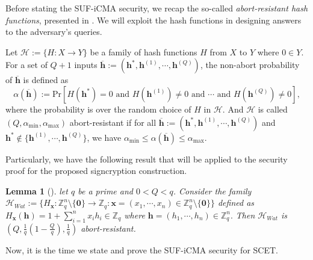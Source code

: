 \documentclass[a4paper,11pt,onecolumn]{elsarticle}
\def\Pr{\mathrm{Pr}}
\newtheorem{lemma}[theorem]{Lemma}
\begin{document}
	
	Before stating the SUF-iCMA security, we recap  the so-called \textit{abort-resistant hash functions}, presented in \cite[Section 7.4.1]{ABB10}. We will exploit the hash functions in designing answers to the adversary's queries.
	
	\begin{definition} \label{def3}
		Let $\mathcal{H}:=\{H:X\rightarrow Y\}$ be a family of hash functions $H$ from $X$ to $Y$ where $0 \in Y$. For a set of $Q+1$ inputs $\overline{\textbf{h}}:=(\textbf{h}^*,\textbf{h}^{(1)}, \cdots, \textbf{h}^{(Q)})$, the non-abort probability of $\overline{\textbf{h}}$ is defined as
		$$\alpha(\overline{\textbf{h}}):=\Pr[H(\textbf{h}^*)=0 \text{ and }H(\textbf{h}^{(1)})\neq 0 \text{ and } \cdots \text{ and } H(\textbf{h}^{(Q)})\neq0],$$
		where the probability is over the random choice of $H$ in $\mathcal{H}$. And $\mathcal{H}$ is called $(Q, \alpha_{\min}, \alpha_{\max})$ abort-resistant if for all $\overline{\textbf{h}}:=(\textbf{h}^*,\textbf{h}^{(1)}, \cdots, \textbf{h}^{(Q)})$ and $\textbf{h}^* \notin \{\textbf{h}^{(1)}, \cdots, \textbf{h}^{(Q)} \}$, we have $ \alpha_{\min}\leq \alpha(\overline{\textbf{h}})\leq  \alpha_{\max}$.
	\end{definition}
	Particularly, we have the following result that will be applied to the security proof for the proposed signcryption construction. 
	
	\begin{lemma}[{\cite[Lemma 27]{ABB10}}] \label{lemma3}
		let $q$ be a prime and $0<Q<q$. Consider the family	$\mathcal{H}_{Wat}:=\{H_{\mathbf{x}}: \mathbb{Z}^{n}_q \setminus \{\mathbf{0}\}\rightarrow \mathbb{Z}_q:  \mathbf{x}=(x_1, \cdots, x_n) \in \mathbb{Z}^{n}_q \setminus \{\mathbf{0}\}\}$  defined  as
		$H_{\mathbf{x}}(\mathbf{h})=1+\sum_{i=1}^{n}x_ih_i \in \mathbb{Z}_q$   where  $ \mathbf{h}=(h_1, \cdots, h_n) \in \mathbb{Z}^{n}_q.$ Then $\mathcal{H}_{Wat}$ is $(Q, \frac{1}{q}(1-\frac{Q}{q}), \frac{1}{q})$ abort-resistant.
	\end{lemma}
	Now, it is the time we  state and prove the SUF-iCMA security for \textsf{SCET}.
	
\end{document}
